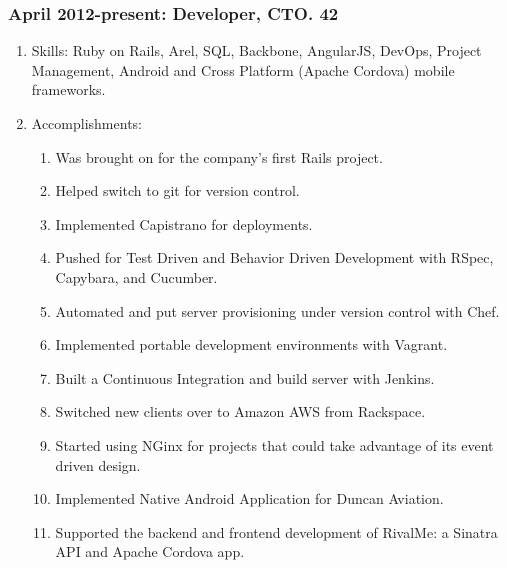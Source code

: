 \documentclass[11pt]{article}
\begin{document}
\subsubsection{April 2012-present: Developer, CTO. 42}
\label{sec-1-2-1}
\begin{enumerate}
\item Skills: Ruby on Rails, Arel, SQL, Backbone, AngularJS, DevOps, Project Management, Android and Cross Platform (Apache Cordova) mobile frameworks.
\label{sec-1-2-1-1}
\item Accomplishments:
\label{sec-1-2-1-2}
\begin{enumerate}
\item Was brought on for the company's first Rails project.
\label{sec-1-2-1-2-1}
\item Helped switch to git for version control.
\label{sec-1-2-1-2-2}
\item Implemented Capistrano for deployments.
\label{sec-1-2-1-2-3}
\item Pushed for Test Driven and Behavior Driven Development with RSpec, Capybara, and Cucumber.
\label{sec-1-2-1-2-4}
\item Automated and put server provisioning under version control with Chef.
\label{sec-1-2-1-2-5}
\item Implemented portable development environments with Vagrant.
\label{sec-1-2-1-2-6}
\item Built a Continuous Integration and build server with Jenkins.
\label{sec-1-2-1-2-7}
\item Switched new clients over to Amazon AWS from Rackspace.
\label{sec-1-2-1-2-8}
\item Started using NGinx for projects that could take advantage of its event driven design.
\label{sec-1-2-1-2-9}
\item Implemented Native Android Application for Duncan Aviation.
\label{sec-1-2-1-2-10}
\item Supported the backend and frontend development of RivalMe: a Sinatra API and Apache Cordova app.
\label{sec-1-2-1-2-11}
\end{enumerate}
\end{enumerate}
\end{document}
